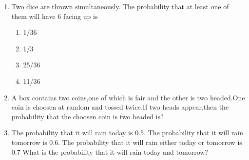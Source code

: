\begin{enumerate}[label=\thesection.\arabic*.,ref=\thesection.\theenumi]
%
\item Two dice are thrown simultaneously. The probability that at least one of them will have 6 facing up is
\begin{enumerate}[label={\Alph*)}]
    \item 1/36
    \item 1/3
    \item 25/36
    \item 11/36
\end{enumerate}
%
\solution


%
\item A box contains two coins,one of which is fair and the other is two headed.One coin is choosen at random and tossed twice.If two heads appear,then  the probability that the choosen coin is two headed is?
%
\solution


%
\item The probability that it will rain today is 0.5. The probability that it will rain tomorrow is 0.6. The probability that it will rain either today or tomorrow is 0.7 What is the probability that it will rain today and tomorrow?
%
\solution



\end{enumerate}
